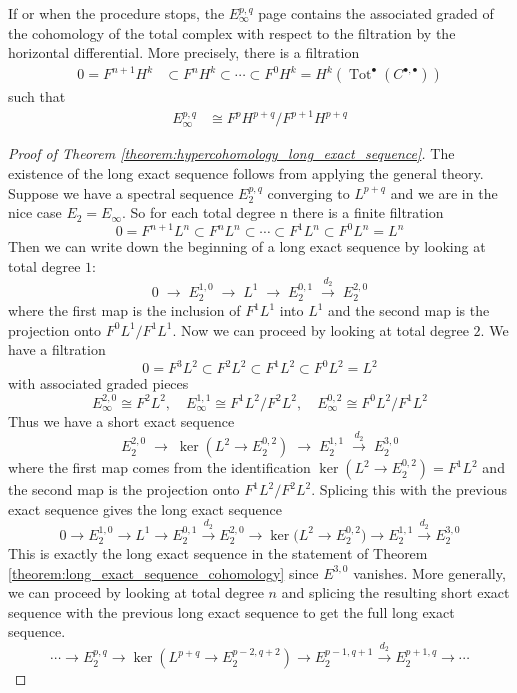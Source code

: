 \documentclass[12pt]{article}
\begin{document}
\begin{theorem}
    If or when the procedure stops, the $E^{p,q}_{\infty}$ page contains the associated graded of the cohomology of the total complex with respect to the filtration by the horizontal differential. More precisely, there is a filtration \begin{align*}
        0 = F^{n+1}H^k & \subset F^n H^k \subset \cdots \subset F^0 H^k = H^k(\operatorname{Tot}^{\bullet}(C^{\bullet,\bullet}))
    \end{align*} such that \begin{align*}
        E_{\infty}^{p,q} & \cong F^p H^{p+q} / F^{p+1} H^{p+q}
    \end{align*}
\end{theorem}

\begin{proof}
    [Proof of Theorem \ref{theorem:hypercohomology_long_exact_sequence}]
    The existence of the long exact sequence follows from applying the general theory. Suppose we have a spectral sequence $E_2^{p,q}$ converging to $L^{p+q}$ and we are in the nice case $E_2 = E_{\infty}$. So for each total degree n there is a finite filtration
\[0=F^{n+1}L^n\subset F^{n}L^n\subset\cdots\subset F^{1}L^n\subset F^{0}L^n=L^n\] Then we can write down the beginning of a long exact sequence by looking at total degree $1$:
\[
0\;\to\;E_2^{1,0}\;\to\;L^1\;\to\;E_2^{0,1}\;\xrightarrow{d_2}\;E_2^{2,0}\]
where the first map is the inclusion of $F^1L^1$ into $L^1$ and the second map is the projection onto $F^0L^1/F^1L^1$. Now we can proceed by looking at total degree $2$. We have a filtration
\[0=F^{3}L^2\subset F^{2}L^2\subset F^{1}L^2\subset F^{0}L^2=L^2\] with associated graded pieces
\[E_{\infty}^{2,0}\cong F^2L^2,\quad E_{\infty}^{1,1}\cong F^1L^2/F^2L^2,\quad E_{\infty}^{0,2}\cong F^0L^2/F^1L^2\] Thus we have a short exact sequence 
\[
E_2^{2,0}\;\to\;\ker(L^2\to E_2^{0,2})\;\to\;E_2^{1,1}\;\xrightarrow{d_2}\;E_2^{3,0}\] where the first map comes from the identification $\ker (L^2\to E_2^{0,2})=F^1L^2$ and the second map is the projection onto $F^1L^2/F^2L^2$. Splicing this with the previous exact sequence gives the long exact sequence \[0 \to E_2^{1,0} \to L^1 \to E_2^{0,1}
\xrightarrow{d_2}
E_2^{2,0} \to \ker\bigl(L^2 \to E_2^{0,2}\bigr)
\to E_2^{1,1} \xrightarrow{d_2} E_2^{3,0}\]
This is exactly the long exact sequence in the statement of Theorem \ref{theorem:long_exact_sequence_cohomology} since $E^{3,0}$ vanishes. More generally, we can proceed by looking at total degree $n$ and splicing the resulting short exact sequence with the previous long exact sequence to get the full long exact sequence.
\[
\cdots \longrightarrow E_2^{p,q}
\longrightarrow \ker(L^{p+q}\to E_2^{p-2,q+2})
\longrightarrow E_2^{p-1,q+1}
\xrightarrow{d_2} E_2^{p+1,q}
\longrightarrow \cdots
\]
\end{proof}
\end{document}

